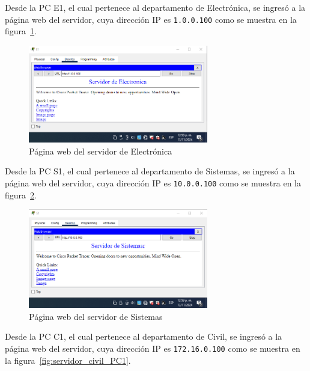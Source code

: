         Desde la PC E1, el cual pertenece al departamento de Electrónica, se ingresó a la página web del servidor, cuya dirección IP es \texttt{1.0.0.100} como se muestra en la figura~\ref{fig:servidor_electronica_PC1}.

        \begin{figure}[H]
            \centering
            \includegraphics[width=0.7\textwidth]{img/servidor_electronica_PC1.png}
            \caption{Página web del servidor de Electrónica}
            \label{fig:servidor_electronica_PC1}
        \end{figure}

        Desde la PC S1, el cual pertenece al departamento de Sistemas, se ingresó a la página web del servidor, cuya dirección IP es \texttt{10.0.0.100} como se muestra en la figura~\ref{fig:servidor_sistemas_PC1}.

        \begin{figure}[H]
            \centering
            \includegraphics[width=0.7\textwidth]{img/servidor_sistemaPC1.png}
            \caption{Página web del servidor de Sistemas}
            \label{fig:servidor_sistemas_PC1}
        \end{figure}

        Desde la PC C1, el cual pertenece al departamento de Civil, se ingresó a la página web del servidor, cuya dirección IP es \texttt{172.16.0.100} como se muestra en la figura~\ref{fig:servidor_civil_PC1}.

